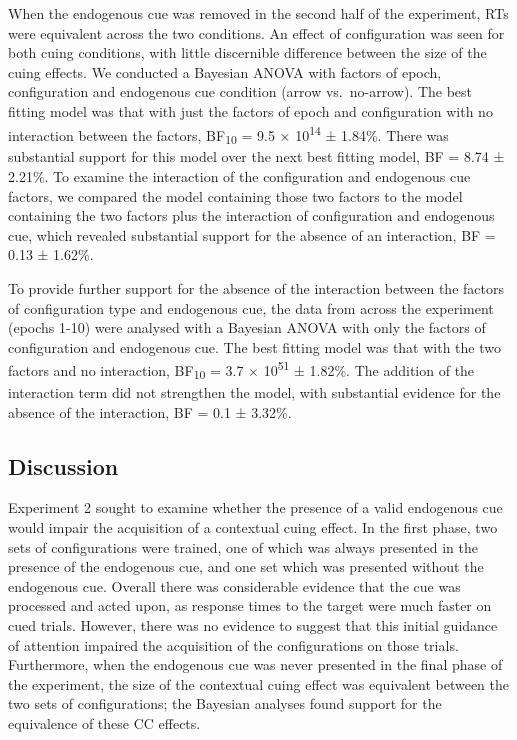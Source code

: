 \documentclass[
  man,floatsintext]{apa7}
\begin{document}
When the endogenous cue was removed in the second half of the experiment, RTs were equivalent across the two conditions. An effect of configuration was seen for both cuing conditions, with little discernible difference between the size of the cuing effects. We conducted a Bayesian ANOVA with factors of epoch, configuration and endogenous cue condition (arrow vs.~no-arrow). The best fitting model was that with just the factors of epoch and configuration with no interaction between the factors, BF\textsubscript{10} = 9.5 × 10\textsuperscript{14} ± 1.84\%. There was substantial support for this model over the next best fitting model, BF = 8.74 ± 2.21\%. To examine the interaction of the configuration and endogenous cue factors, we compared the model containing those two factors to the model containing the two factors plus the interaction of configuration and endogenous cue, which revealed substantial support for the absence of an interaction, BF = 0.13 ± 1.62\%.

To provide further support for the absence of the interaction between the factors of configuration type and endogenous cue, the data from across the experiment (epochs 1-10) were analysed with a Bayesian ANOVA with only the factors of configuration and endogenous cue. The best fitting model was that with the two factors and no interaction, BF\textsubscript{10} = 3.7 × 10\textsuperscript{51} ± 1.82\%. The addition of the interaction term did not strengthen the model, with substantial evidence for the absence of the interaction, BF = 0.1 ± 3.32\%.

\hypertarget{discussion-1}{%
\subsection{Discussion}\label{discussion-1}}

Experiment 2 sought to examine whether the presence of a valid endogenous cue would impair the acquisition of a contextual cuing effect. In the first phase, two sets of configurations were trained, one of which was always presented in the presence of the endogenous cue, and one set which was presented without the endogenous cue. Overall there was considerable evidence that the cue was processed and acted upon, as response times to the target were much faster on cued trials. However, there was no evidence to suggest that this initial guidance of attention impaired the acquisition of the configurations on those trials. Furthermore, when the endogenous cue was never presented in the final phase of the experiment, the size of the contextual cuing effect was equivalent between the two sets of configurations; the Bayesian analyses found support for the equivalence of these CC effects.
\end{document}
